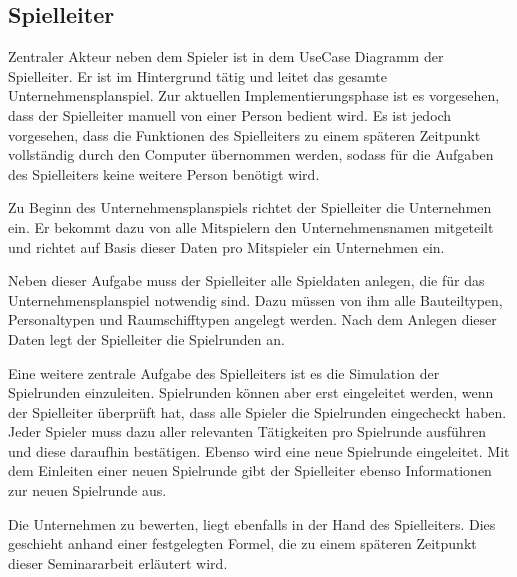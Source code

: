 \subsection{Spielleiter}
\label{sec:fachkonzept-usecase-spielleiter}


Zentraler Akteur neben dem Spieler ist in dem UseCase Diagramm der Spielleiter. Er ist im Hintergrund tätig und leitet das gesamte Unternehmensplanspiel. Zur aktuellen Implementierungsphase ist es vorgesehen, dass der Spielleiter manuell von einer Person bedient wird. Es ist jedoch vorgesehen, dass die Funktionen des Spielleiters zu einem späteren Zeitpunkt vollständig durch den Computer übernommen werden, sodass für die Aufgaben des Spielleiters keine weitere Person benötigt wird.
 
Zu Beginn des Unternehmensplanspiels richtet der Spielleiter die Unternehmen ein. Er bekommt dazu von alle Mitspielern den Unternehmensnamen mitgeteilt und richtet auf Basis dieser Daten pro Mitspieler ein Unternehmen ein.
 
Neben dieser Aufgabe muss der Spielleiter alle Spieldaten anlegen, die für das Unternehmensplanspiel notwendig sind. Dazu müssen von ihm alle Bauteiltypen, Personaltypen und Raumschifftypen angelegt werden. Nach dem Anlegen dieser Daten legt der Spielleiter die Spielrunden an.
 
Eine weitere zentrale Aufgabe des Spielleiters ist es die Simulation der Spielrunden einzuleiten. Spielrunden können aber erst eingeleitet werden, wenn der Spielleiter überprüft hat, dass alle Spieler die Spielrunden eingecheckt haben. Jeder Spieler muss dazu aller relevanten Tätigkeiten pro Spielrunde ausführen und diese daraufhin bestätigen. Ebenso wird eine neue Spielrunde eingeleitet.  Mit dem Einleiten einer neuen Spielrunde gibt der Spielleiter ebenso Informationen zur neuen Spielrunde aus.
 
Die Unternehmen zu bewerten, liegt ebenfalls in der Hand des Spielleiters. Dies geschieht anhand einer festgelegten Formel, die zu einem späteren Zeitpunkt dieser Seminararbeit erläutert wird.

\autorende{}